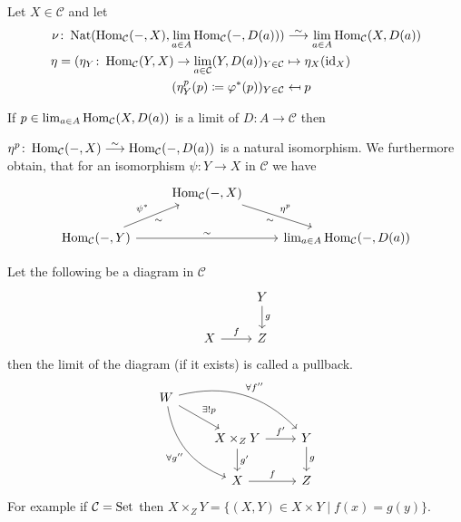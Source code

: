 \begin{rmd}
    Let $ X \in \mathcal{ C } $ and let 
    \begin{align*}
        \nu \colon \Nat ( \Hom_{\mathcal{ C } } ( - , X ) , \lim_{ a \in A } \Hom_{\mathcal{ C } } ( - , D ( a ) ) ) 
        &\isomorphism
        \lim_{ a \in A } \Hom_{ \mathcal{ C } }( X , D ( a ) ) 
        \\
        \eta = ( \eta_Y \colon \Hom_{ \mathcal{ C } } (  Y , X ) \to \lim_{ a \in \mathcal{ C } } ( Y , D ( a ) )_{ Y \in \mathcal{ C } } 
        &\mapsto 
        \eta_X ( \id_X )
        \\
        ( \eta^p_Y ( p ) \coloneqq \varphi^* ( p ) )_{ Y \in \mathcal{ C }}
        &\mapsfrom
        p
    \end{align*}
\end{rmd}

If $ p \in \lim_{a \in A} \operatorname{Hom}_{ \mathcal{ C } } ( X , D ( a ) ) $ is a limit of $ D \colon A \to \mathcal{ C } $ then 

$ \eta^p \colon \Hom_{ \mathcal{ C } } ( - ,  X ) \isomorphism \Hom_{ \mathcal{ C } } ( - , D ( a ) ) $ is a natural isomorphism. 
We furthermore obtain, that for an isomorphism $\psi \colon Y \to X $ in $\mathcal{ C } $ we have 
\[
\begin{tikzcd}
    & 
    \Hom_{\mathcal{ C } } ( - , X ) 
    \ar[rd, " \eta^p ", "\sim"']
    \\
    \Hom_{ \mathcal{ C } } ( - , Y ) 
    \ar[ru , " \psi^*" , " \sim"' ]
    \ar[rr, " \sim " ]
    &&
    \lim_{ a \in A } \Hom_{ \mathcal{ C } } ( - , D ( a ) ) 
\end{tikzcd}
\]
\begin{exmp}
    Let the following be a diagram in $ \mathcal{ C } $ 
    \[
    \begin{tikzcd}
        &
        Y
        \ar[d , "g" ]
        \\
        X
        \ar[r, "f" ]
        &
        Z
    \end{tikzcd}
    \]
    then the limit of the diagram (if it exists) is called a pullback.
    \[
    \begin{tikzcd}
        W
        \ar[rrd, bend left, "\forall f'' " ]
        \ar[rd, " \exists! p "]
        \ar[rdd, bend right, " \forall g'' "' ]
        \\
        &
        X \times_Z Y 
        \ar[ r , " f'" ]
        \ar[d, " g' "]
        &
        Y
        \ar[d, " g "]
        \\
        &
        X
        \ar[r, "f"]
        &
        Z
    \end{tikzcd}
    \]
    For example if $ \mathcal{ C } = \operatorname{Set}$ then $ X  \times_Z Y = \{ ( X , Y ) \in X \times Y \mid f ( x ) = g ( y ) \}$.
\end{exmp}

